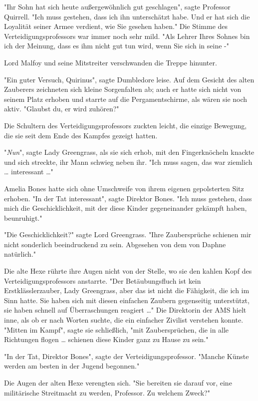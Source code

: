 {"Ihr Sohn hat sich heute außergewöhnlich gut geschlagen", sagte Professor Quirrell. "Ich muss gestehen, dass ich ihn unterschätzt habe. Und er hat sich die Loyalität seiner Armee verdient, wie Sie gesehen haben." Die Stimme des Verteidigungsprofessors war immer noch sehr mild. "Als Lehrer Ihres Sohnes bin ich der Meinung, dass es ihm nicht gut tun wird, wenn Sie sich in seine -"

Lord Malfoy und seine Mitstreiter verschwanden die Treppe hinunter.

"Ein guter Versuch, Quirinus", sagte Dumbledore leise. Auf dem Gesicht des alten Zauberers zeichneten sich kleine Sorgenfalten ab; auch er hatte sich nicht von seinem Platz erhoben und starrte auf die Pergamentschirme, als wären sie noch aktiv. "Glaubst du, er wird zuhören?"

Die Schultern des Verteidigungsprofessors zuckten leicht, die einzige Bewegung, die sie seit dem Ende des Kampfes gezeigt hatten.

"\emph{Nun}", sagte Lady Greengrass, als sie sich erhob, mit den Fingerknöcheln knackte und sich streckte, ihr Mann schwieg neben ihr. "Ich muss sagen, das war ziemlich … interessant …"

Amelia Bones hatte sich ohne Umschweife von ihrem eigenen gepolsterten Sitz erhoben. "In der Tat interessant", sagte Direktor Bones. "Ich muss gestehen, dass mich die Geschicklichkeit, mit der diese Kinder gegeneinander gekämpft haben, beunruhigt."

"Die Geschicklichkeit?" sagte Lord Greengrass. "Ihre Zaubersprüche schienen mir nicht sonderlich beeindruckend zu sein. Abgesehen von dem von Daphne natürlich."

Die alte Hexe rührte ihre Augen nicht von der Stelle, wo sie den kahlen Kopf des Verteidigungsprofessors anstarrte. "Der Betäubungsfluch ist kein Erstklässlerzauber, Lady Greengrass, aber das ist nicht die Fähigkeit, die ich im Sinn hatte. Sie haben sich mit diesen einfachen Zaubern gegenseitig unterstützt, sie haben schnell auf Überraschungen reagiert …" Die Direktorin der AMS hielt inne, als ob er nach Worten suchte, die ein einfacher Zivilist verstehen konnte. "Mitten im Kampf", sagte sie schließlich, "mit Zaubersprüchen, die in alle Richtungen flogen … schienen diese Kinder ganz zu Hause zu sein."

"In der Tat, Direktor Bones", sagte der Verteidigungsprofessor. "Manche Künste werden am besten in der Jugend begonnen."

Die Augen der alten Hexe verengten sich. "Sie bereiten sie darauf vor, eine militärische Streitmacht zu werden, Professor. Zu welchem Zweck?"

}
